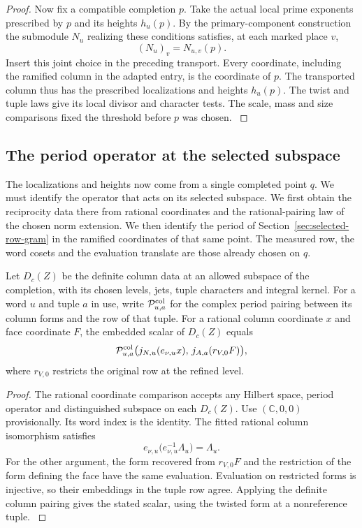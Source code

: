 \begin{proof}
Now fix a compatible completion \(p\). Take the actual local
prime exponents prescribed by \(p\) and its heights \(h_u(p)\).
By the primary-component construction the submodule \(N_u\)
realizing these conditions satisfies, at each marked place \(v\),
\[
              (N_u)_v=N_{u,v}(p).
\]
Insert this joint choice in the preceding transport. Every
coordinate, including the ramified column in the adapted entry,
is the coordinate of \(p\). The transported column thus has the prescribed
localizations and heights \(h_u(p)\). The
twist and tuple laws give its local divisor and character tests.
The scale, mass and size comparisons fixed the threshold before
\(p\) was chosen. \label{cor:automorphic-realization-65}

\end{proof}

\subsection{The period operator at the selected subspace}
\label{subsec:selected-completion-period}

The localizations and heights now come from a single completed point \(q\). We must identify the operator that acts on its selected subspace. We first obtain the
reciprocity data there from rational coordinates and the
rational-pairing law of the chosen norm extension. We then
identify the period of Section~\ref{sec:selected-row-gram}
in the ramified coordinates of that same point. The measured
row, the word cosets and the evaluation translate are those
already chosen on \(q\).


\begin{lemma}\label{lem:completed-rational-period-reading}
Let \(D_c(Z)\) be the definite column data at an allowed subspace
of the completion, with its chosen levels, jets, tuple characters
and integral kernel. For a word \(u\) and tuple \(a\) in use, write
\(\mathcal P^{\rm col}_{u,a}\) for the complex period pairing between
its column forms and the row of that tuple. For a rational column
coordinate \(x\) and face coordinate \(F\), the embedded scalar of \(D_c(Z)\) equals
\[
 \mathcal P^{\rm col}_{u,a}
       \big(j_{N,u}(e_{\nu,u}x),\,j_{A,a}(r_{V,0}F)\big),
\]
where \(r_{V,0}\) restricts the original row at the refined level.
\end{lemma}
\begin{proof}
The rational coordinate comparison accepts any Hilbert space,
period operator and distinguished subspace on each \(D_c(Z)\).
Use \((\mathbb C,0,0)\) provisionally. Its word index is the
identity. The fitted rational column isomorphism satisfies
\[
       e_{\nu,u}\big(e_{\nu,u}^{-1}\Lambda_u\big)=\Lambda_u .
\]
For the other argument, the form recovered from \(r_{V,0}F\)
and the restriction of the form defining the face have the same
evaluation. Evaluation on restricted forms is injective, so their
embeddings in the tuple row agree. Applying the definite column
pairing gives the stated scalar, using the twisted form at a
nonreference tuple. \label{cor:automorphic-realization-66}
\end{proof}

